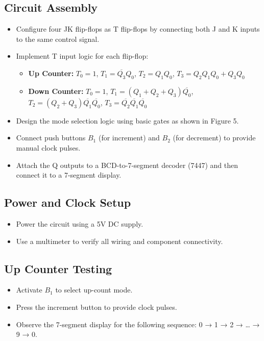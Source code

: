 \documentclass[12pt]{article}
\begin{document}
\subsection*{Circuit Assembly}
\begin{itemize}
    \item Configure four JK flip-flops as T flip-flops by connecting both J and K inputs to the same control signal.
    \item Implement T input logic for each flip-flop:
    \begin{itemize}
        \item \textbf{Up Counter:} $T_0 = 1$, $T_1 = \overline{Q_3}Q_0$, $T_2 = Q_1Q_0$, $T_3 = Q_2Q_1Q_0 + Q_3Q_0$
        \item \textbf{Down Counter:} $T_0 = 1$, $T_1 = (Q_1 + Q_2 + Q_3)\overline{Q_0}$, $T_2 = (Q_2 + Q_3)\overline{Q_1}\overline{Q_0}$, $T_3 = \overline{Q_2}\overline{Q_1}\overline{Q_0}$
    \end{itemize}
    \item Design the mode selection logic using basic gates as shown in Figure 5.
    \item Connect push buttons $B_1$ (for increment) and $B_2$ (for decrement) to provide manual clock pulses.
    \item Attach the Q outputs to a BCD-to-7-segment decoder (7447) and then connect it to a 7-segment display.
\end{itemize}

\subsection*{Power and Clock Setup}
\begin{itemize}
    \item Power the circuit using a 5V DC supply.
    \item Use a multimeter to verify all wiring and component connectivity.
\end{itemize}

\subsection*{Up Counter Testing}
\begin{itemize}
    \item Activate $B_1$ to select up-count mode.
    \item Press the increment button to provide clock pulses.
    \item Observe the 7-segment display for the following sequence: 0 → 1 → 2 → … → 9 → 0.
\end{itemize}
\end{document}

